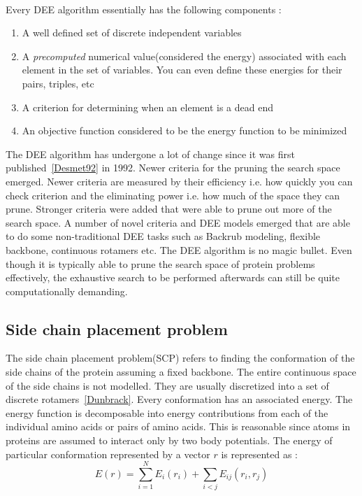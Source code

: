 \documentclass[a4]{article}
\begin{document}
\\
Every DEE algorithm essentially has the following components :
\begin{enumerate}
\item A well defined set of discrete independent variables
\item A \emph{precomputed} numerical value(considered the energy) associated with each element in the set of variables. You can even define these energies for their pairs, triples, etc
\item A criterion for determining when an element is a dead end
\item An objective function considered to be the energy function to be minimized
\end{enumerate}



The DEE algorithm has undergone a lot of change since it was first published~\ref{Desmet92} in 1992. Newer criteria for the pruning the search space emerged. Newer criteria are measured by their efficiency i.e. how quickly you can check criterion and the eliminating power i.e. how much of the space they can prune. Stronger criteria were added that were able to prune out more of the search space. A number of novel criteria and DEE models emerged that are able to do some non-traditional DEE tasks such as Backrub modeling, flexible backbone, continuous rotamers etc. The DEE algorithm is no magic bullet. Even though it is typically able to prune the search space of protein problems effectively, the exhaustive search to be performed afterwards can still be quite computationally demanding.

\subsection{Side chain placement problem}
The side chain placement problem(SCP) refers to finding the conformation of the side chains of the protein assuming a fixed backbone. The entire continuous space of the side chains is not modelled. They are usually discretized into a set of discrete rotamers~\ref{Dunbrack}. Every conformation has an associated energy. The energy function is decomposable into energy contributions from each of the individual amino acids or pairs of amino acids. This is reasonable since atoms in proteins are assumed to interact only by two body potentials. The energy of particular conformation represented by a vector $r$ is represented as : 
\[
E(r) = \sum_{i=1}^{N}E_i(r_i) + \sum_{i<j}E_{ij}(r_i,r_j)
\]
\end{document}
